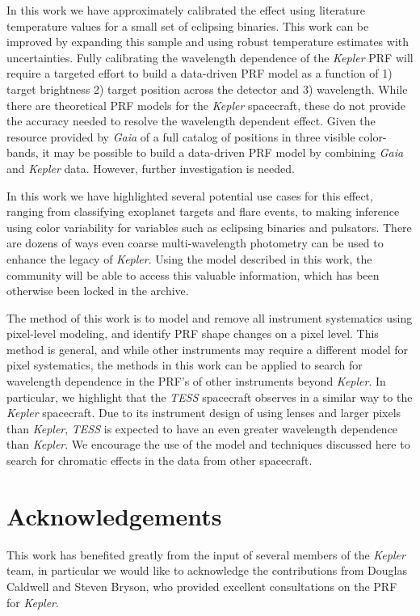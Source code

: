 \documentclass[iop]{emulateapj}
\newcommand{\kepler}{\emph{Kepler}\xspace}
\newcommand{\tess}{\emph{TESS}\xspace}
\begin{document}
In this work we have approximately calibrated the effect using literature temperature values for a small set of eclipsing binaries. This work can be improved by expanding this sample and using robust temperature estimates with uncertainties. Fully calibrating the wavelength dependence of the \kepler PRF will require a targeted effort to build a data-driven PRF model as a function of 1) target brightness 2) target position across the detector and 3) wavelength. While there are theoretical PRF models for the \kepler spacecraft, these do not provide the accuracy needed to resolve the wavelength dependent effect. Given the resource provided by \emph{Gaia} of a full catalog of positions in three visible color-bands, it may be possible to build a data-driven PRF model by combining \emph{Gaia} and \kepler data. However, further investigation is needed.

In this work we have highlighted several potential use cases for this effect, ranging from classifying exoplanet targets and flare events, to making inference using color variability for variables such as eclipsing binaries and pulsators. There are dozens of ways even coarse multi-wavelength photometry can be used to enhance the legacy of \kepler. Using the model described in this work, the community will be able to access this valuable information, which has been otherwise been locked in the archive.

The method of this work is to model and remove all instrument systematics using pixel-level modeling, and identify PRF shape changes on a pixel level. This method is general, and while other instruments may require a different model for pixel systematics, the methods in this work can be applied to search for wavelength dependence in the PRF's of other instruments beyond \kepler. In particular, we highlight that the \tess spacecraft observes in a similar way to the \kepler spacecraft. Due to its instrument design of using lenses and larger pixels than \kepler, \tess is expected to have an even greater wavelength dependence than \kepler. We encourage the use of the model and techniques discussed here to search for chromatic effects in the data from other spacecraft.

\section{Acknowledgements}

This work has benefited greatly from the input of several members of the \kepler team, in particular we would like to acknowledge the contributions from Douglas Caldwell and Steven Bryson, who provided excellent consultations on the PRF for \kepler.
\end{document}
